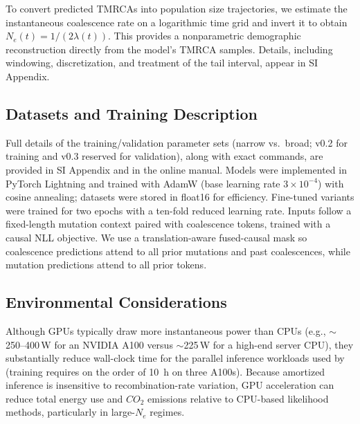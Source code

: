 \documentclass[9pt,twocolumn,twoside]{pnas-new}
\begin{document}
{To convert predicted TMRCAs into population size trajectories, 
we estimate the instantaneous coalescence rate on a logarithmic time grid 
and invert it to obtain $N_e(t) = 1 / (2\lambda(t))$. 
This provides a nonparametric demographic reconstruction directly from the model's TMRCA samples. 
Details, including windowing, discretization, and treatment of the tail interval, 
appear in SI Appendix.


\subsection*{Datasets and Training Description}
\label{datasets}

Full details of the training/validation parameter sets (narrow vs.\ broad; \stdpopsim v0.2 for training and v0.3 reserved for validation), along with exact commands, are provided in SI Appendix and in the online manual. 
Models were implemented in PyTorch Lightning and trained with AdamW (base learning rate $3\times10^{-4}$) with cosine annealing; datasets were stored in float16 for efficiency. 
Fine-tuned variants were trained for two epochs with a ten-fold reduced learning rate. 
Inputs follow a fixed-length mutation context paired with coalescence tokens, trained with a causal NLL objective. 
We use a translation-aware fused-causal mask so coalescence predictions attend to all prior mutations and past coalescences, while mutation predictions attend to all prior tokens.


\subsection*{Environmental Considerations}
Although GPUs typically draw more instantaneous power than CPUs
(e.g., ${\sim}$250--400\,W for an NVIDIA A100 versus ${\sim}$225\,W for a high-end server CPU),
they substantially reduce wall-clock time for the parallel inference workloads used by \cxtkit
(training requires on the order of 10~h on three A100s).
Because amortized inference is insensitive to recombination-rate variation,
GPU acceleration can reduce total energy use and $CO_{2}$ emissions relative to CPU-based likelihood methods, particularly in large-$N_e$ regimes.

}

\showmatmethods{}

\end{document}
